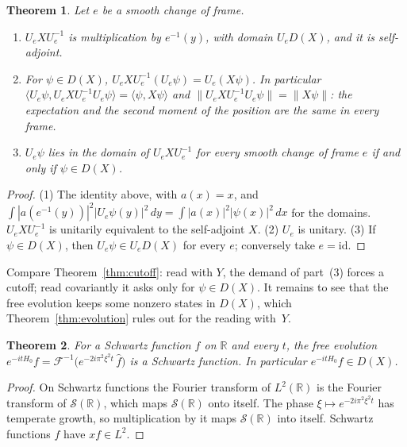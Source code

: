 \documentclass[11pt]{article}
\newtheorem{theorem}{Theorem}[section]
\theoremstyle{remark}
\newcommand{\ip}[2]{\langle #1, #2\rangle}
\begin{document}
\begin{theorem}\label{thm:covariant}
  Let $e$ be a smooth change of frame.
  \begin{enumerate}
    \item $U_e X U_e^{-1}$ is multiplication by $e^{-1}(y)$, with domain $U_e D(X)$, and it is
      self-adjoint.
    \item For $\psi \in D(X)$, $U_e X U_e^{-1}(U_e\psi) = U_e(X\psi)$. In particular
      $\ip{U_e\psi}{U_e X U_e^{-1} U_e\psi} = \ip{\psi}{X\psi}$ and
      $\|U_e X U_e^{-1} U_e\psi\| = \|X\psi\|$: the expectation and the second moment of the
      position are the same in every frame.
    \item $U_e\psi$ lies in the domain of $U_e X U_e^{-1}$ for every smooth change of frame $e$
      if and only if $\psi \in D(X)$.
  \end{enumerate}
\end{theorem}

\begin{proof}
  (1) The identity above, with $a(x) = x$, and $\int |a(e^{-1}(y))|^2 |U_e\psi(y)|^2\,dy =
  \int |a(x)|^2|\psi(x)|^2\,dx$ for the domains. $U_e X U_e^{-1}$ is unitarily equivalent to
  the self-adjoint $X$. (2) $U_e$ is unitary. (3) If $\psi \in D(X)$, then $U_e\psi \in U_e D(X)$
  for every $e$; conversely take $e = \mathrm{id}$.
\end{proof}

Compare Theorem~\ref{thm:cutoff}: read with $Y$, the demand of part~(3) forces a cutoff; read
covariantly it asks only for $\psi \in D(X)$. It remains to see that the free evolution keeps
some nonzero states in $D(X)$, which Theorem~\ref{thm:evolution} rules out for the reading
with~$Y$.

\begin{theorem}\label{thm:schwartzevolution}
  For a Schwartz function $f$ on $\mathbb R$ and every $t$, the free evolution
  $e^{-itH_0}f = \mathcal F^{-1}\bigl(e^{-2i\pi^2\xi^2 t}\,\hat f\bigr)$ is a Schwartz function.
  In particular $e^{-itH_0}f \in D(X)$.
\end{theorem}

\begin{proof}
  On Schwartz functions the Fourier transform of $L^2(\mathbb R)$ is the Fourier transform of
  $\mathcal S(\mathbb R)$, which maps $\mathcal S(\mathbb R)$ onto itself. The phase
  $\xi \mapsto e^{-2i\pi^2\xi^2 t}$ has temperate growth, so multiplication by it maps
  $\mathcal S(\mathbb R)$ into itself. Schwartz functions $f$ have $xf \in L^2$.
\end{proof}
\end{document}
